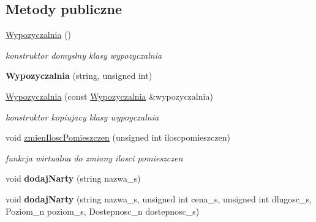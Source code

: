 \subsection*{Metody publiczne}
\begin{DoxyCompactItemize}
\item 
\mbox{\label{class_wypozyczalnia_adffda4f25858a6454b298d217903354a}} 
\hyperlink{class_wypozyczalnia_adffda4f25858a6454b298d217903354a}{Wypozyczalnia} ()
\begin{DoxyCompactList}\small\item\em konstruktor domyslny klasy wypozyczalnia \end{DoxyCompactList}\item 
\mbox{\label{class_wypozyczalnia_afa521c8f4087a3587af1597de6d1d67c}} 
{\bfseries Wypozyczalnia} (string, unsigned int)
\item 
\mbox{\label{class_wypozyczalnia_aef0b87f9ab0a39e8384e48d3d80503ad}} 
\hyperlink{class_wypozyczalnia_aef0b87f9ab0a39e8384e48d3d80503ad}{Wypozyczalnia} (const \hyperlink{class_wypozyczalnia}{Wypozyczalnia} \&wypozyczalnia)
\begin{DoxyCompactList}\small\item\em konstruktor kopiujacy klasy wypoyczalnia \end{DoxyCompactList}\item 
\mbox{\label{class_wypozyczalnia_ad341700b6cfc7de365475a210b2a9bdb}} 
void \hyperlink{class_wypozyczalnia_ad341700b6cfc7de365475a210b2a9bdb}{zmien\+Ilosc\+Pomieszczen} (unsigned int iloscpomieszczen)
\begin{DoxyCompactList}\small\item\em funkcja wirtualna do zmiany ilosci pomieszczen \end{DoxyCompactList}\item 
\mbox{\label{class_wypozyczalnia_a1de447b411ead2785381ee0293937a32}} 
void {\bfseries dodaj\+Narty} (string nazwa\+\_\+s)
\item 
\mbox{\label{class_wypozyczalnia_ac7adef1f4f60b4b99a8853910936fc5e}} 
void {\bfseries dodaj\+Narty} (string nazwa\+\_\+s, unsigned int cena\+\_\+s, unsigned int dlugosc\+\_\+s, Poziom\+\_\+n poziom\+\_\+s, Dostepnosc\+\_\+n dostepnosc\+\_\+s)

\end{DoxyCompactItemize}
